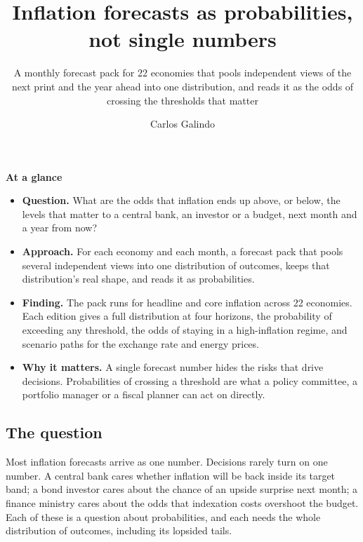 \documentclass[
  british,
  a4paper,
]{article}
\title{Inflation forecasts as probabilities, not single numbers}
\subtitle{A monthly forecast pack for 22 economies that pools
independent views of the next print and the year ahead into one
distribution, and reads it as the odds of crossing the thresholds that
matter}
\author{Carlos Galindo}
\date{}
\providecommand{\tightlist}{%
  \setlength{\itemsep}{0pt}\setlength{\parskip}{0pt}}
\begin{document}
\maketitle


\begin{tcolorbox}[enhanced jigsaw, arc=.35mm, bottomrule=.15mm, breakable, colback=white, colframe=quarto-callout-note-color-frame, left=2mm, leftrule=.75mm, opacityback=0, rightrule=.15mm, toprule=.15mm]

\vspace{-3mm}\textbf{At a glance}\vspace{3mm}

\begin{itemize}
\tightlist
\item
  \textbf{Question.} What are the odds that inflation ends up above, or
  below, the levels that matter to a central bank, an investor or a
  budget, next month and a year from now?
\item
  \textbf{Approach.} For each economy and each month, a forecast pack
  that pools several independent views into one distribution of
  outcomes, keeps that distribution's real shape, and reads it as
  probabilities.
\item
  \textbf{Finding.} The pack runs for headline and core inflation across
  22 economies. Each edition gives a full distribution at four horizons,
  the probability of exceeding any threshold, the odds of staying in a
  high-inflation regime, and scenario paths for the exchange rate and
  energy prices.
\item
  \textbf{Why it matters.} A single forecast number hides the risks that
  drive decisions. Probabilities of crossing a threshold are what a
  policy committee, a portfolio manager or a fiscal planner can act on
  directly.
\end{itemize}

\end{tcolorbox}

\subsection{The question}\label{the-question}

Most inflation forecasts arrive as one number. Decisions rarely turn on
one number. A central bank cares whether inflation will be back inside
its target band; a bond investor cares about the chance of an upside
surprise next month; a finance ministry cares about the odds that
indexation costs overshoot the budget. Each of these is a question about
probabilities, and each needs the whole distribution of outcomes,
including its lopsided tails.
\end{document}
